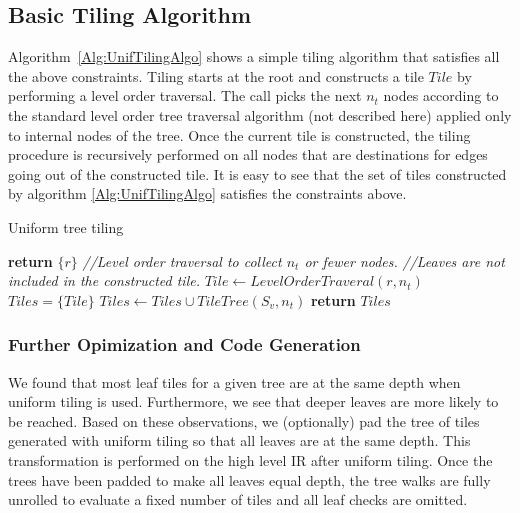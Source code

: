 \subsection{Basic Tiling Algorithm}
\label{sec:UnifTiling}
Algorithm~\ref{Alg:UnifTilingAlgo} shows a simple tiling algorithm that satisfies all the above constraints. 
Tiling starts at the root and constructs a tile $Tile$ by performing
a level order traversal. The call  picks the next $n_t$ nodes according to the standard level order tree traversal algorithm (not described here) applied only to internal nodes of the tree. Once the current tile is constructed, the tiling procedure is recursively performed on all nodes that are 
destinations for edges going out of the constructed tile.
It is easy to see that the set of tiles constructed by algorithm \ref{Alg:UnifTilingAlgo} satisfies the constraints above.
\begin{algorithm}
  \caption{Uniform tree tiling}
  \label{Alg:UnifTilingAlgo}
  \begin{algorithmic}
              \State \textbf{return} $\{ r \}$
          \EndIf
          \State \textcolor{codegreen}{\textit{//Level order traversal to collect $n_t$ or fewer nodes. }}
          \State \textcolor{codegreen}{\textit{//Leaves are not included in the constructed tile. }}
          \State $Tile \leftarrow LevelOrderTraveral(r, n_t)$
          \State $Tiles =  \{ Tile \}$
              \State $Tiles \leftarrow Tiles \cup TileTree(S_v, n_t)$
          \EndFor
          \State \textbf{return} $Tiles$
      \EndProcedure
  \end{algorithmic}
\end{algorithm}

\subsubsection{Further Opimization and Code Generation}
We found that most leaf tiles for a given tree are at the same depth when uniform tiling is used. Furthermore, we see that deeper leaves 
are more likely to be reached.
Based on these observations, we (optionally) pad the tree of tiles generated with uniform tiling so that all leaves are at the same depth.
This transformation is performed on the high level IR after uniform tiling. 
Once the trees have been padded to make all leaves equal depth, the tree walks are fully unrolled to evaluate a fixed 
number of tiles and all leaf checks are omitted.

